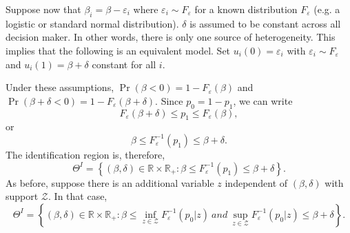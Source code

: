 \documentclass{article}
\begin{document}
Suppose now that $\beta _{i}=\beta -\varepsilon _{i}$ where $\varepsilon
_{i}\sim F_{\varepsilon }$ for a known distribution $F_{\varepsilon }$ (e.g.
a logistic or standard normal distribution). $\delta $ is assumed to be
constant across all decision maker. In other words, there is only one source
of heterogeneity. This implies that the following is an equivalent model.
Set $u_{i}\left( 0\right) =\varepsilon _{i}$ with $\varepsilon _{i}\sim
F_{\varepsilon }$ and $u_{i}\left( 1\right) =\beta +\delta $ constant for
all $i$.

Under these assumptions, $\Pr \left( \beta <0\right) =1-F_{\varepsilon
}\left( \beta \right) $ and $\Pr \left( \beta +\delta <0\right)
=1-F_{\varepsilon }\left( \beta +\delta \right) $. Since $p_{0}=1-p_{1}$, we
can write 
\begin{equation*}
F_{\varepsilon }\left( \beta +\delta \right) \leq p_{1}\leq F_{\varepsilon
}\left( \beta \right) ,
\end{equation*}%
or%
\begin{equation*}
\beta \leq F_{\varepsilon }^{-1}\left( p_{1}\right) \leq \beta +\delta .
\end{equation*}%
The identification region is, therefore, 
\begin{equation*}
\Theta ^{I}=\left\{ \left( \beta ,\delta \right) \in 
\mathbb{R}
\times 
\mathbb{R}
_{+}:\beta \leq F_{\varepsilon }^{-1}\left( p_{1}\right) \leq \beta +\delta
\right\} .
\end{equation*}%
As before, suppose there is an additional variable $z$ independent of $%
\left( \beta ,\delta \right) $ with support $\mathcal{Z}$. In that case,%
\begin{equation*}
\Theta ^{I}=\left\{ \left( \beta ,\delta \right) \in 
\mathbb{R}
\times 
\mathbb{R}
_{+}:\beta \leq \inf_{z\in \mathcal{Z}}F_{\varepsilon }^{-1}\left(
p_{0}|z\right) \ and\ \sup_{z\in \mathcal{Z}}F_{\varepsilon }^{-1}\left(
p_{0}|z\right) \leq \beta +\delta \right\} .
\end{equation*}





\newpage

\setcounter{page}{1} 
\printbibliography
\end{document}
